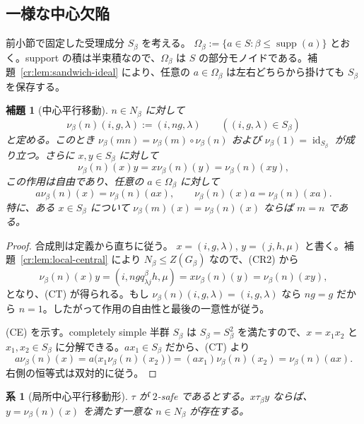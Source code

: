 \documentclass[10pt,a4paper]{ltjsarticle}
\newtheorem{lemma}[theorem]{補題}
\newtheorem{corollary}[theorem]{系}
\theoremstyle{definition}
\theoremstyle{remark}
\begin{document}
\subsection{一様な中心欠陥}

前小節で固定した受理成分 $S_\beta$ を考える。
\(\Omega_\beta:=\{a\in S:\beta\le\operatorname{supp}(a)\}\)
とおく。support の積は半束積なので、\(\Omega_\beta\) は $S$ の部分モノイドである。補題~\ref{cr:lem:sandwich-ideal} により、任意の $a\in\Omega_\beta$ は左右どちらから掛けても $S_\beta$ を保存する。

\begin{lemma}[中心平行移動]
\label{cr:lem:central-translations}
\(n\in N_\beta\) に対して
\[
\nu_\beta(n)(i,g,\lambda):=(i,ng,\lambda)
\qquad((i,g,\lambda)\in S_\beta)
\]
と定める。このとき
\(\nu_\beta(mn)=\nu_\beta(m)\circ\nu_\beta(n)\) および
\(\nu_\beta(1)=\operatorname{id}_{S_\beta}\)
が成り立つ。さらに $x,y\in S_\beta$ に対して
\[
\nu_\beta(n)(x)y=x\nu_\beta(n)(y)=\nu_\beta(n)(xy),
\tag{CT}
\]
この作用は自由であり、任意の \(a\in\Omega_\beta\) に対して
\[
a\nu_\beta(n)(x)=\nu_\beta(n)(ax),
\qquad
\nu_\beta(n)(x)a=\nu_\beta(n)(xa).
\tag{CE}
\]
特に、ある $x\in S_\beta$ について
\(\nu_\beta(m)(x)=\nu_\beta(n)(x)\)
ならば $m=n$ である。
\end{lemma}

\begin{proof}
合成則は定義から直ちに従う。
\(x=(i,g,\lambda)\), \(y=(j,h,\mu)\)
と書く。補題~\ref{cr:lem:local-central} により
\(N_\beta\le Z(G_\beta)\) なので、\textup{(CR2)} から
\[
\nu_\beta(n)(x)y
=(i,ngq^\beta_{\lambda j}h,\mu)
=x\nu_\beta(n)(y)
=\nu_\beta(n)(xy),
\]
となり、\textup{(CT)} が得られる。もし
\(\nu_\beta(n)(i,g,\lambda)=(i,g,\lambda)\)
なら $ng=g$ だから $n=1$。したがって作用の自由性と最後の一意性が従う。

\textup{(CE)} を示す。completely simple 半群 $S_\beta$ は $S_\beta=S_\beta^2$ を満たすので、$x=x_1x_2$ と $x_1,x_2\in S_\beta$ に分解できる。$ax_1\in S_\beta$ だから、\textup{(CT)} より
\[
a\nu_\beta(n)(x)
=a\bigl(x_1\nu_\beta(n)(x_2)\bigr)
=(ax_1)\nu_\beta(n)(x_2)
=\nu_\beta(n)(ax).
\]
右側の恒等式は双対的に従う。
\end{proof}

\begin{corollary}[局所中心平行移動形]
\label{cr:cor:local-translation}
$\tau$ が $2$-safe であるとする。$x\tau_\beta y$ ならば、
\(y=\nu_\beta(n)(x)\)
を満たす一意な \(n\in N_\beta\) が存在する。
\end{corollary}
\end{document}

